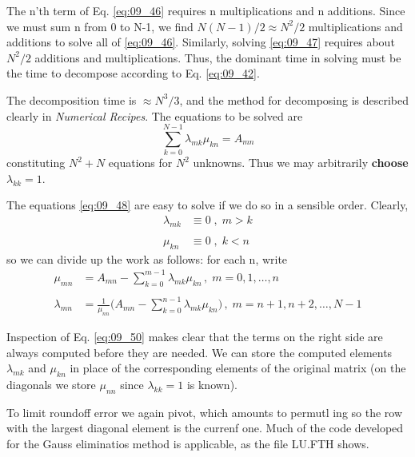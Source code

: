 The n'th term of Eq. \ref{eq:09_46} requires n multiplications and n additions.
Since we must sum n from 0 to N-1, we find $N(N-1)/2 \approx N^2/2$
multiplications and additions to solve all of \ref{eq:09_46}. Similarly, solving 
\ref{eq:09_47} requires about $N^2/2$ additions and multiplications. Thus, the
dominant time in solving must be the time to decompose according to Eq. \ref{eq:09_42}.

The decomposition time is $\approx N^3/3$, and the method for decomposing is
described clearly in \textit{Numerical Recipes}. The equations
to be solved are
\begin{equation}
    \label{eq:09_48}
    \sum_{k=0}^{N-1}\lambda_{mk}\mu_{kn}=A_{mn}
\end{equation}
constituting $N^2 + N$ equations for $N^2$ unknowns. Thus we may
arbitrarily \textbf{choose} $\lambda_{kk} = 1$.

The equations \ref{eq:09_48} are easy to solve if we do so in a sensible order.
Clearly,
\begin{align}
    \label{eq:09_49}
    \lambda_{mk} &\equiv 0\;,\; m > k  \nonumber \\
    &\\
    \mu_{kn} &\equiv 0\;,\; k < n  \nonumber
\end{align}
so we can divide up the work as follows: for each n, write
\begin{align}
    \label{eq:09_50}
    \mu_{mn} &= A_{mn} - \sum_{k=0}^{m-1}\lambda_{mk}\mu_{kn}\,,\;m=0,1,\dotsc,n  \nonumber \\
    & \\
    \lambda_{mn} &=\frac{1}{\mu_{nn}}\Big(A_{mn}-\sum_{k=0}^{n-1}\lambda_{mk}\mu_{kn}\Big)\,,\; m=n+1, n+2, \dotsc, N-1  \nonumber
\end{align}

Inspection of Eq. \ref{eq:09_50} makes clear that the terms on the right side
are always computed before they are needed. We can store the
computed elements $\lambda_{mk}$ and $\mu_{kn}$ in place of the corresponding
elements of the original matrix (on the diagonals we store  $\mu_{nn}$
since $\lambda_{kk} = 1$ is known).

To limit roundoff error we again pivot, which amounts to permutl
ing so the row with the largest diagonal element is the currenf
one. Much of the code developed for the Gauss eliminatios
method is applicable, as the file LU.FTH shows.

